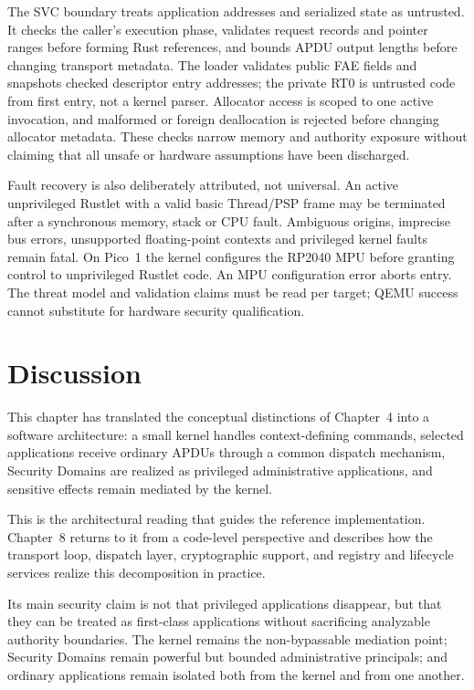 The SVC boundary treats application addresses and serialized state as
untrusted. It checks the caller's execution phase, validates request records
and pointer ranges before forming Rust references, and bounds APDU output
lengths before changing transport metadata. The loader validates public FAE
fields and snapshots checked descriptor entry addresses; the private RT0 is
untrusted code from first entry, not a kernel parser. Allocator access is
scoped to one active invocation, and malformed or foreign deallocation is
rejected before changing allocator metadata. These checks narrow memory and
authority exposure without claiming that all unsafe or hardware assumptions
have been discharged.

Fault recovery is also deliberately attributed, not universal. An active
unprivileged Rustlet with a valid basic Thread/PSP frame may be terminated
after a synchronous memory, stack or CPU fault. Ambiguous origins, imprecise
bus errors, unsupported floating-point contexts and privileged kernel faults
remain fatal. On Pico~1 the kernel configures the RP2040 MPU before granting control
to unprivileged Rustlet code. An MPU configuration error aborts entry. The threat model and validation claims must be read per target;
QEMU success cannot substitute for hardware security qualification.

\section{Discussion}


This chapter has translated the conceptual distinctions of Chapter~4 into
a software architecture: a small kernel handles context-defining
commands, selected applications receive ordinary APDUs through a common
dispatch mechanism, Security Domains are realized as privileged
administrative applications, and sensitive effects remain mediated by the
kernel.

This is the architectural reading that guides the reference
implementation. Chapter~8 returns to it from a code-level perspective and
describes how the transport loop, dispatch layer, cryptographic support,
and registry and lifecycle services realize this decomposition in
practice.

Its main security claim is not that privileged applications disappear,
but that they can be treated as first-class applications without
sacrificing analyzable authority boundaries. The kernel remains the
non-bypassable mediation point; Security Domains remain powerful but
bounded administrative principals; and ordinary applications remain
isolated both from the kernel and from one another.

